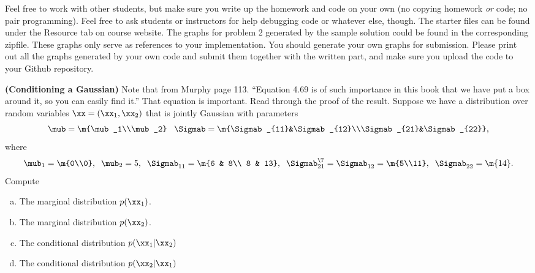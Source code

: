 \documentclass[12pt,letterpaper,fleqn]{hmcpset}
\begin{document}
Feel free to work with other students, but make sure you write up the homework
and code on your own (no copying homework \textit{or} code; no pair programming).
Feel free to ask students or instructors for help debugging code or whatever else,
though.
\newline
\newline
The starter files can be found under the Resource tab on course website. The graphs for problem 2 generated by the sample solution could be found in the corresponding zipfile. These graphs only serve as references to your implementation. You should generate your own graphs for submission. Please print out all the graphs generated by your own code and submit them together with the written part, and make sure you upload the code to your Github repository.

\begin{problem}[1]
	\textbf{(Conditioning a Gaussian)} Note that from Murphy page 113. ``Equation 4.69
	is of such importance in this book that we have put a box around it, so you can easily
	find it.'' That equation is important. Read through the proof of the result.
	Suppose we have a distribution over random variables $\xx = (\xx_1, \xx_2)$ that is
	jointly Gaussian with parameters
	\[
		\mub = \m{\mub_1\\\mub_2}\;\;\; \Sigmab = \m{\Sigmab_{11}&\Sigmab_{12}\\\Sigmab_{21}&\Sigmab_{22}},
	\]
	where
	\[
		\mub_1 = \m{0\\0}, \;\; \mub_2 = 5, \;\; \Sigmab_{11} = \m{6 & 8\\ 8 & 13}, \;\; \Sigmab_{21}^\T = \Sigmab_{12} = \m{5\\11}, \;\; \Sigmab_{22} = \m{14}.
	\]
	Compute
	\begin{enumerate}[(a)]
		\item The marginal distribution $p(\xx_1)$.
		\item The marginal distribution $p(\xx_2)$.
		\item The conditional distribution $p(\xx_1 | \xx_2)$
		\item The conditional distribution $p(\xx_2 | \xx_1)$
	\end{enumerate}

\end{problem}
\begin{solution}
	\vfill
\end{solution}
\newpage
\end{document}
